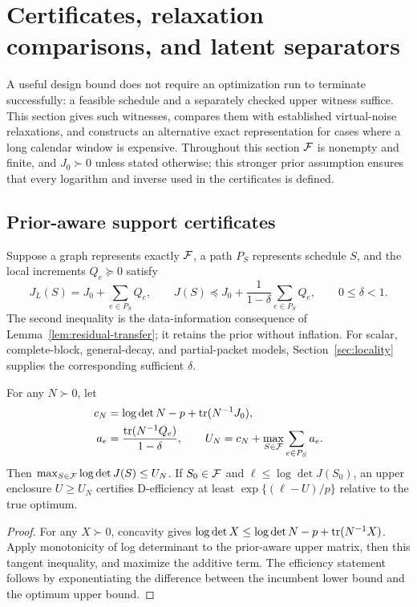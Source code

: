 \section{Certificates, relaxation comparisons, and latent separators}
\label{sec:certification}

A useful design bound does not require an optimization run to terminate
successfully: a feasible schedule and a separately checked upper witness
suffice. This section gives such witnesses, compares them with established
virtual-noise relaxations, and constructs an alternative exact representation
for cases where a long calendar window is expensive. Throughout this section
$\mathcal F$ is nonempty and finite, and $J_0\succ0$ unless stated otherwise; this
stronger prior assumption ensures that every logarithm and inverse used in
the certificates is defined.

\subsection{Prior-aware support certificates}
\label{subsec:local-certificates}
Suppose a graph represents exactly $\mathcal F$, a path $P_S$ represents schedule
$S$, and the local increments $Q_e\succeq0$ satisfy
\[
 J_L(S)=J_0+\sum_{e\in P_S}Q_e,\qquad
 J(S)\preceq J_0+\frac{1}{1-\delta}\sum_{e\in P_S}Q_e,
 \qquad 0\le\delta<1.
\]
The second inequality is the data-information consequence of
Lemma~\ref{lem:residual-transfer}; it retains the prior without inflation.
For scalar, complete-block, general-decay, and partial-packet models,
Section~\ref{sec:locality} supplies the corresponding sufficient $\delta$.

\begin{theorem}\label{thm:local-certificate}
For any $N\succ0$, let
\begin{align}
 c_N&=\log\det N-p+\operatorname{tr}(N^{-1}J_0),\nonumber\\
 a_e&=\frac{\operatorname{tr}(N^{-1}Q_e)}{1-\delta},\qquad
 U_N=c_N+\max_{S\in\mathcal F}\sum_{e\in P_S}a_e.
 \label{eq:local-certificate}
\end{align}
Then $\max_{S\in\mathcal F}\log\det J(S)\le U_N$.
If $S_0\in\mathcal F$ and $\ell\le\log\det J(S_0)$, an upper enclosure
$U\ge U_N$ certifies D-efficiency at least $\exp\{(\ell-U)/p\}$
relative to the true optimum.
\end{theorem}
\begin{proof}
For any $X\succ0$, concavity gives
$\log\det X\le\log\det N-p+\operatorname{tr}(N^{-1}X)$.
Apply monotonicity of log determinant to the prior-aware upper matrix,
then this tangent inequality, and maximize the additive term. The efficiency
statement follows by exponentiating the difference between the incumbent
lower bound and the optimum upper bound.
\end{proof}

